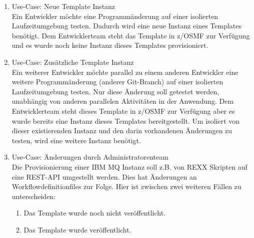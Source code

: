 \begin{samepage}
\begin{enumerate}
\item Use-Case: Neue Template Instanz\\
Ein Entwickler möchte eine Programmänderung auf einer isolierten Laufzeitumgebung testen.
Dadurch wird eine neue Instanz eines Templates benötigt.
Dem Entwicklerteam steht das Template in z/OSMF zur Verfügung und es wurde noch keine Instanz dieses Templates provisioniert.

\item Use-Case: Zusätzliche Template Instanz\\
Ein weiterer Entwickler möchte parallel zu einem anderen Entwickler eine weitere Programmänderung (anderer \glqq Git-Branch\grqq) auf einer isolierten Laufzeitumgebung testen. 
Nur diese Änderung soll getestet werden, unabhängig von anderen parallelen Aktivitäten in der Anwendung. 
Dem Entwicklerteam steht dieses Template in z/OSMF zur Verfügung aber es wurde  bereits eine Instanz dieses Templates bereitgestellt. 
Um isoliert von dieser existierenden Instanz und den darin vorhandenen Änderungen zu testen, wird eine weitere Instanz benötigt.

\item Use-Case: Änderungen durch Administratorenteam\\
Die Provisionierung  einer IBM MQ Instanz soll z.B. von REXX Skripten auf eine REST-API umgestellt werden.
Dies hat Änderungen an Workflowdefinitionfiles zur Folge.
Hier ist zwischen zwei weiteren Fällen zu unterscheiden:
\begin{enumerate}
\item Das Template wurde noch nicht veröffentlicht.
\item Das Template wurde veröffentlicht.
\end{enumerate}
\end{enumerate}
\end{samepage}

